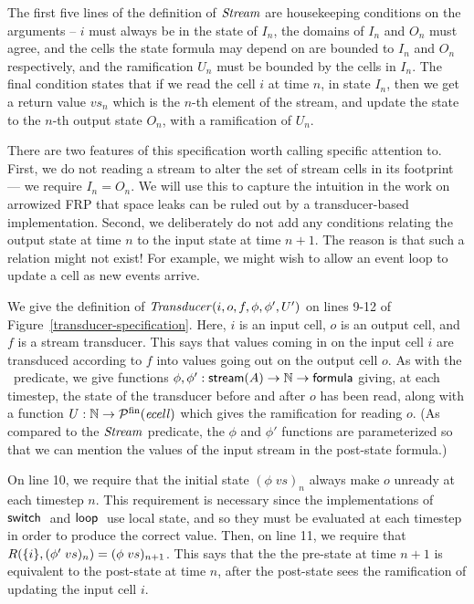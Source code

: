 The first five lines of the definition of $\mathit{Stream}$ are housekeeping
conditions on the arguments -- $i$ must always be in the state of
$I_n$, the domains of $I_n$ and $O_n$ must agree, and the cells the
state formula may depend on are bounded to $I_n$ and $O_n$
respectively, and the ramification $U_n$ must be bounded by the cells
in $I_n$. The final condition states that if we read the cell $i$ at
time $n$, in state $I_n$, then we get a return value $vs_n$ which is
the $n$-th element of the stream, and update the state to the $n$-th
output state $O_n$, with a ramification of $U_n$. 

There are two features of this specification worth calling specific
attention to. First, we do not reading a stream to alter the set of
stream cells in its footprint --- we require $I_n = O_n$.  We will use
this to capture the intuition in the work on arrowized FRP that space
leaks can be ruled out by a transducer-based implementation.  Second,
we deliberately do not add any conditions relating the output state at
time $n$ to the input state at time $n+1$. The reason is that such a
relation might not exist! For example, we might wish to allow an event
loop to update a cell as new events arrive. 

We give the definition of $\mathit{Transducer}(i, o, f, \phi, \phi', U')$ on
lines 9-12 of Figure~\ref{transducer-specification}. Here, $i$ is an
input cell, $o$ is an output cell, and $f$ is a stream transducer.
This says that values coming in on the input cell $i$ are transduced
according to $f$ into values going out on the output cell $o$. As with
the \Stream\ predicate, we give functions $\phi, \phi' :
\mathsf{stream}(A) \to \mathbb{N} \to \mathsf{formula}$ giving, at each timestep, the
state of the transducer before and after $o$ has been read, along with
a function $U : \mathbb{N} \to \mathcal{P}^{\mathrm{fin}}(\mathit{ecell})$ which gives the
ramification for reading $o$. (As compared to the $\mathit{Stream}$ predicate,
the $\phi$ and $\phi'$ functions are parameterized so that we can
mention the values of the input stream in the post-state formula.)

On line 10, we require that the initial state $(\phi\;vs)_n$ always make $o$
unready at each timestep $n$. This requirement is necessary since the
implementations of $\mathsf{switch}\;$ and $\mathsf{loop}\;$ use local state, and so
they must be evaluated at each timestep in order to produce the
correct value. Then, on line 11, we require that $R(\{{i}\},
(\phi'\;vs)_n) = (\phi\;vs)_{n+1}$.  This says that the the pre-state at time
$n+1$ is equivalent to the post-state at time $n$, after the
post-state sees the ramification of updating the input cell $i$.

